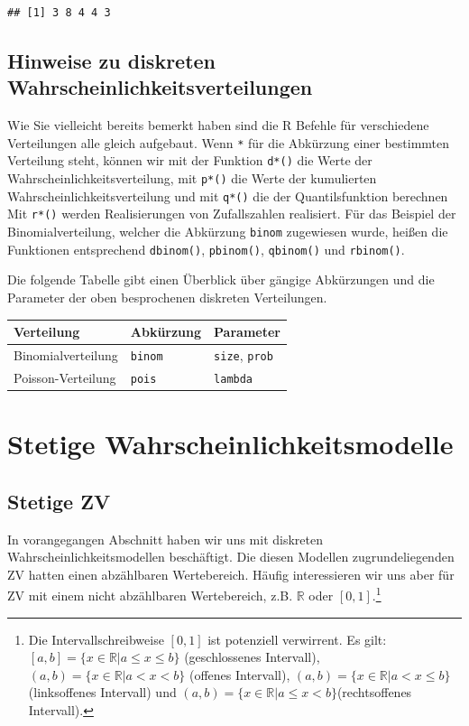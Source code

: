 \documentclass[]{book}
\let\rmarkdownfootnote\footnote%
\def\footnote{\protect\rmarkdownfootnote}
\begin{document}
\begin{verbatim}
## [1] 3 8 4 4 3
\end{verbatim}

\subsection{Hinweise zu diskreten
Wahrscheinlichkeitsverteilungen}\label{hinweise-zu-diskreten-wahrscheinlichkeitsverteilungen}

Wie Sie vielleicht bereits bemerkt haben sind die R Befehle für
verschiedene Verteilungen alle gleich aufgebaut. Wenn \texttt{*} für die
Abkürzung einer bestimmten Verteilung steht, können wir mit der Funktion
\texttt{d*()} die Werte der Wahrscheinlichkeitsverteilung, mit
\texttt{p*()} die Werte der kumulierten Wahrscheinlichkeitsverteilung
und mit \texttt{q*()} die der Quantilsfunktion berechnen Mit
\texttt{r*()} werden Realisierungen von Zufallszahlen realisiert. Für
das Beispiel der Binomialverteilung, welcher die Abkürzung
\texttt{binom} zugewiesen wurde, heißen die Funktionen entsprechend
\texttt{dbinom()}, \texttt{pbinom()}, \texttt{qbinom()} und
\texttt{rbinom()}.

Die folgende Tabelle gibt einen Überblick über gängige Abkürzungen und
die Parameter der oben besprochenen diskreten Verteilungen.

\begin{longtable}[]{@{}lll@{}}
\toprule
Verteilung & Abkürzung & Parameter\tabularnewline
\midrule
\endhead
Binomialverteilung & \texttt{binom} & \texttt{size},
\texttt{prob}\tabularnewline
Poisson-Verteilung & \texttt{pois} & \texttt{lambda}\tabularnewline
\bottomrule
\end{longtable}

\section{Stetige
Wahrscheinlichkeitsmodelle}\label{stetige-wahrscheinlichkeitsmodelle}

\subsection{Stetige ZV}\label{stetige-zv}

In vorangegangen Abschnitt haben wir uns mit diskreten
Wahrscheinlichkeitsmodellen beschäftigt. Die diesen Modellen
zugrundeliegenden ZV hatten einen abzählbaren Wertebereich. Häufig
interessieren wir uns aber für ZV mit einem nicht abzählbaren
Wertebereich, z.B. \(\mathbb{R}\) oder \([0,1]\).\footnote{Die
  Intervallschreibweise \([0,1]\) ist potenziell verwirrent. Es gilt:
  \([a,b]=\{x\in\mathbb{R} | a\leq x \leq b\}\) (geschlossenes
  Intervall), \((a,b)=\{x\in\mathbb{R} | a < x < b\}\) (offenes
  Intervall), \((a,b)=\{x\in\mathbb{R} | a < x \leq b\}\)(linksoffenes
  Intervall) und
  \((a,b)=\{x\in\mathbb{R} | a \leq x < b\}\)(rechtsoffenes Intervall).}
\end{document}
